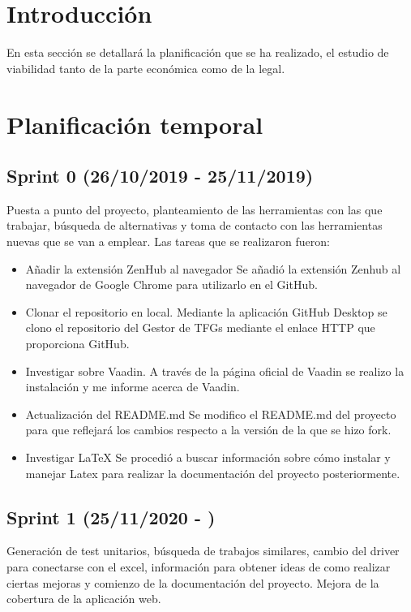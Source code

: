 
\section{Introducción}
En esta sección se detallará la planificación que se ha realizado, el estudio de viabilidad tanto de la parte económica como de la legal.

\section{Planificación temporal}
\subsection{Sprint 0 (26/10/2019 - 25/11/2019)}
Puesta a punto del proyecto, planteamiento de las herramientas con las que trabajar, búsqueda de alternativas y toma de contacto con las herramientas nuevas que se van a emplear.
Las tareas que se realizaron fueron:
\begin{itemize}
	\tightlist
	\item Añadir la extensión ZenHub al navegador
		Se añadió la extensión Zenhub al navegador de Google Chrome para utilizarlo en el GitHub.
	\item Clonar el repositorio en local. 
		Mediante la aplicación GitHub Desktop se clono el repositorio del Gestor de TFGs mediante el enlace HTTP que proporciona GitHub.
	\item Investigar sobre Vaadin.
		A través de la página oficial de Vaadin se realizo la instalación y me informe acerca de Vaadin.
	\item Actualización del README.md 
		Se modifico el README.md del proyecto para que reflejará los cambios respecto a la versión de la que se hizo fork. 
	\item Investigar LaTeX
		Se procedió a buscar información sobre cómo instalar y manejar Latex para realizar la documentación del proyecto posteriormente.
\end{itemize}

\subsection{Sprint 1 (25/11/2020 - )}
Generación de test unitarios, búsqueda de trabajos similares, cambio del driver para conectarse con el excel, información para obtener ideas de como realizar ciertas mejoras y comienzo de la documentación del proyecto. Mejora de la cobertura de la aplicación web.

